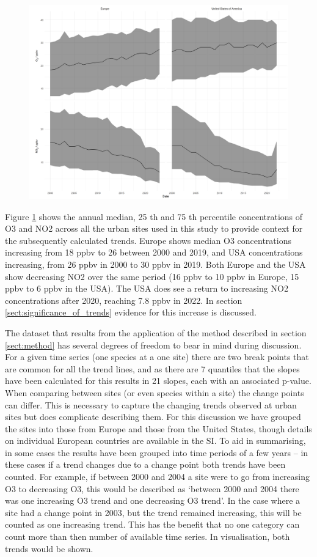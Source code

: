 \documentclass[journal abbreviation, manuscript]{copernicus}
\begin{document}
\begin{figure}[t]
\includegraphics[width=12cm]{plots/o3_no2_conc.png}
\caption{}
\label{fig:conc_plot}
\end{figure}

Figure \ref{fig:conc_plot} shows the annual median, 25 th and 75 th percentile concentrations of O3 and NO2 across all the urban sites used in this study to provide context for the subsequently calculated trends. Europe shows median O3 concentrations increasing from 18 ppbv to 26 between 2000 and 2019, and USA concentrations increasing, from 26 ppbv in 2000 to 30 ppbv in 2019. Both Europe and the USA show decreasing NO2 over the same period (16 ppbv to 10 ppbv in Europe, 15 ppbv to 6 ppbv in the USA). The USA does see a return to increasing NO2 concentrations after 2020, reaching 7.8 ppbv in 2022. In section \ref{sect:significance_of_trends} evidence for this increase is discussed. 

The dataset that results from the application of the method described in section \ref{sect:method} has several degrees of freedom to bear in mind during discussion. For a given time series (one species at a one site) there are two break points that are common for all the trend lines, and as there are 7 quantiles that the slopes have been calculated for this results in 21 slopes, each with an associated p-value. When comparing between sites (or even species within a site) the change points can differ. This is necessary to capture the changing trends observed at urban sites but does complicate describing them. For this discussion we have grouped the sites into those from Europe and those from the United States, though details on individual European countries are available in the SI. 
To aid in summarising, in some cases the results have been grouped into time periods of a few years – in these cases if a trend changes due to a change point both trends have been counted. For example, if between 2000 and 2004 a site were to go from increasing O3 to decreasing O3, this would be described as ‘between 2000 and 2004 there was one increasing O3 trend and one decreasing O3 trend’. In the case where a site had a change point in 2003, but the trend remained increasing, this will be counted as one increasing trend. This has the benefit that no one category can count more than then number of available time series. In visualisation, both trends would be shown.
\end{document}
